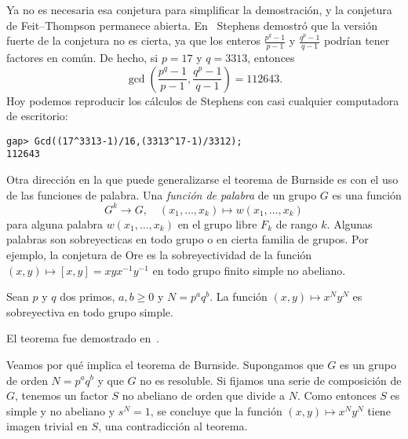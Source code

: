 Ya no es necesaria esa conjetura para simplificar la demostración, 
y la conjetura de Feit--Thompson permanece abierta. 
En~\cite{MR297686} 
Stephens demostró que la versión fuerte de la conjetura no es cierta, ya que 
los enteros $\frac {p^{q}-1}{p-1}$ y $\frac{q^{p} - 1}{q - 1}$ 
podrían tener factores en común. De hecho, si $p=17$ y $q=3313$, 
entonces 
\[
\gcd\left(\frac {p^{q}-1}{p-1},\frac{q^{p} - 1}{q - 1}\right)=112643.
\]
Hoy podemos reproducir los cálculos de 
Stephens con casi cualquier computadora de escritorio:
\begin{lstlisting}
gap> Gcd((17^3313-1)/16,(3313^17-1)/3312);
112643
\end{lstlisting}

Otra dirección en la que puede generalizarse el teorema de Burnside 
es con el uso de las funciones de palabra. 
Una \emph{función de palabra} de un grupo $G$ es una función 
\[
G^k\to G,\quad 
(x_1,\dots,x_k)\mapsto w(x_1,\dots,x_k)
\]
para alguna 
palabra $w(x_1,\dots,x_k)$ en el grupo libre $F_k$ de rango $k$. 
Algunas palabras son sobreyecticas en 
todo grupo o en cierta familia de grupos. Por ejemplo, 
la conjetura de Ore es la sobreyectividad de la función 
$(x,y)\mapsto [x,y]=xyx^{-1}y^{-1}$ en todo grupo finito simple no abeliano.

\begin{theorem}
Sean $p$ y $q$ dos primos, $a,b\geq0$ y $N=p^aq^b$. La función $(x,y)\mapsto x^Ny^N$ es 
sobreyectiva en todo grupo simple.
\end{theorem}

El teorema fue demostrado en~\cite{MR3827208}. 

Veamos por qué implica el teorema de Burnside. Supongamos que $G$ es un grupo de orden $N=p^aq^b$ y que $G$ no es resoluble. 
Si fijamos una serie de composición de $G$, tenemos un factor $S$ no abeliano de orden que divide a $N$. Como entonces
$S$ es simple y no abeliano y $s^N=1$, se concluye que la función $(x,y)\mapsto x^Ny^N$ tiene imagen trivial en $S$, una contradicción al teorema. 

